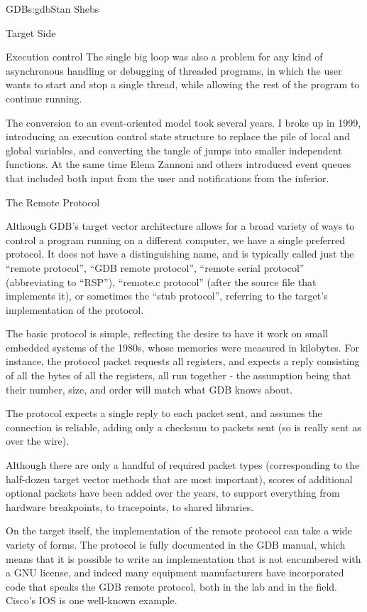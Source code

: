 \begin{aosachapter}{GDB}{s:gdb}{Stan Shebs}
\begin{aosasect1}{Target Side}
\begin{aosasect2}{Execution control}
The single big loop was also a problem for any kind of asynchronous
handling or debugging of threaded programs, in which the user wants to
start and stop a single thread, while allowing the rest of the program
to continue running.

The conversion to an event-oriented model took several years.  I broke
up  in 1999, introducing an execution
control state structure to replace the pile of local and global
variables, and converting the tangle of jumps into smaller independent
functions.  At the same time Elena Zannoni and others introduced event
queues that included both input from the user and notifications from
the inferior.

\end{aosasect2}

\begin{aosasect2}{The Remote Protocol}

Although GDB's target vector architecture allows for a broad variety
of ways to control a program running on a different computer, we have
a single preferred protocol.  It does not have a distinguishing name,
and is typically called just the ``remote protocol'', ``GDB remote
protocol'', ``remote serial protocol'' (abbreviating to ``RSP''),
``remote.c protocol'' (after the source file that implements it), or
sometimes the ``stub protocol'', referring to the target's
implementation of the protocol.

The basic protocol is simple, reflecting the desire to have it work on
small embedded systems of the 1980s, whose memories were measured in
kilobytes.  For instance, the protocol packet  requests all
registers, and expects a reply consisting of all the bytes of all the
registers, all run together - the assumption being that their number,
size, and order will match what GDB knows about.

The protocol expects a single reply to each packet sent, and assumes
the connection is reliable, adding only a checksum to packets sent
(so  is really sent as  over the wire).

Although there are only a handful of required packet types
(corresponding to the half-dozen target vector methods that are most
important), scores of additional optional packets have been added over
the years, to support everything from hardware breakpoints, to
tracepoints, to shared libraries.

On the target itself, the implementation of the remote protocol can
take a wide variety of forms.  The protocol is fully documented in the
GDB manual, which means that it is possible to write an implementation
that is not encumbered with a GNU license, and indeed many equipment
manufacturers have incorporated code that speaks the GDB remote
protocol, both in the lab and in the field.  Cisco's IOS is one
well-known example.


\end{aosasect2}
\end{aosasect1}
\end{aosachapter}
